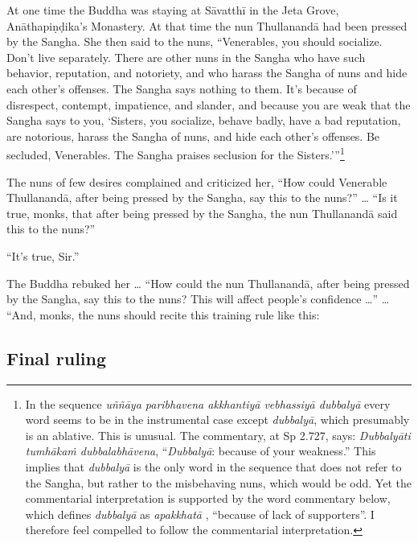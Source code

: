 \documentclass[12pt,openany]{book}%
\begin{document}
At one time the Buddha was staying at \textsanskrit{Sāvatthī} in the Jeta Grove, \textsanskrit{Anāthapiṇḍika}’s Monastery. At that time the nun \textsanskrit{Thullanandā} had been pressed by the Sangha. She then said to the nuns, “Venerables, you should socialize. Don’t live separately. There are other nuns in the Sangha who have such behavior, reputation, and notoriety,  and who harass the Sangha of nuns and hide each other’s offenses. The Sangha says nothing to them. It’s because of disrespect, contempt, impatience, and slander, and because you are weak that the Sangha says to you, ‘Sisters, you socialize, behave badly, have a bad reputation, are notorious, harass the Sangha of nuns, and hide each other’s offenses. Be secluded, Venerables. The Sangha praises seclusion for the Sisters.’”\footnote{In the sequence \textit{\textsanskrit{uññāya} paribhavena \textsanskrit{akkhantiyā} \textsanskrit{vebhassiyā} \textsanskrit{dubbalyā}} every word seems to be in the instrumental case except \textit{\textsanskrit{dubbalyā}}, which presumably is an ablative. This is unusual. The commentary, at Sp 2.727, says: \textit{\textsanskrit{Dubbalyāti} \textsanskrit{tumhākaṁ} \textsanskrit{dubbalabhāvena}}, “\textit{\textsanskrit{Dubbalyā}}: because of your weakness.” This implies that \textit{\textsanskrit{dubbalyā}} is the only word in the sequence that does not refer to the Sangha, but rather to the misbehaving nuns, which would be odd. Yet the commentarial interpretation is supported by the word commentary below, which defines \textit{\textsanskrit{dubbalyā}} as \textit{\textsanskrit{apakkhatā}} , “because of lack of supporters”. I therefore feel compelled to follow the commentarial interpretation. } 

The nuns of few desires complained and criticized her, “How could Venerable \textsanskrit{Thullanandā}, after being pressed by the Sangha, say this to the nuns?” … “Is it true, monks, that after being pressed by the Sangha, the nun \textsanskrit{Thullanandā} said this to the nuns?” 

“It’s true, Sir.” 

The Buddha rebuked her … “How could the nun \textsanskrit{Thullanandā}, after being pressed by the Sangha, say this to the nuns? This will affect people’s confidence …” … “And, monks, the nuns should recite this training rule like this: 

\subsection*{Final ruling }
\end{document}
